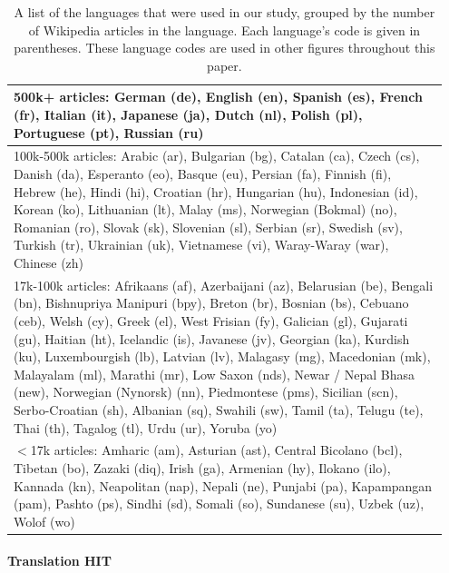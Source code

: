 \documentclass[11pt]{article}
\begin{document}
\begin{table}[h]
\scriptsize 
\begin{center}
\begin{tabular}{|p{0.95\linewidth}|}
\hline
{\sc 500k+ articles:} German (de), English (en), Spanish (es), French (fr), Italian (it), Japanese (ja), Dutch (nl), Polish (pl), Portuguese (pt), Russian (ru)\\
\hline
{\sc 100k-500k articles:} Arabic (ar), Bulgarian (bg), Catalan (ca), Czech (cs), Danish (da), Esperanto (eo), Basque (eu), Persian (fa), Finnish (fi), Hebrew (he), Hindi (hi), Croatian (hr), Hungarian (hu), Indonesian (id), Korean (ko), Lithuanian (lt), Malay (ms), Norwegian (Bokmal) (no), Romanian (ro), Slovak (sk), Slovenian (sl), Serbian (sr), Swedish (sv), Turkish (tr), Ukrainian (uk), Vietnamese (vi), Waray-Waray (war), Chinese (zh)\\
\hline
{\sc 17k-100k articles:}
Afrikaans (af), Azerbaijani (az), Belarusian (be), Bengali (bn), Bishnupriya Manipuri (bpy), Breton (br), Bosnian (bs), Cebuano (ceb), Welsh (cy), Greek (el), West Frisian (fy), Galician (gl), Gujarati (gu), Haitian (ht), Icelandic (is), Javanese (jv), Georgian (ka), Kurdish (ku), Luxembourgish (lb), Latvian (lv), Malagasy (mg), Macedonian (mk), Malayalam (ml), Marathi (mr), Low Saxon (nds), Newar / Nepal Bhasa (new), Norwegian (Nynorsk) (nn), Piedmontese (pms), Sicilian (scn), Serbo-Croatian (sh), Albanian (sq), Swahili (sw), Tamil (ta), Telugu (te), Thai (th), Tagalog (tl), Urdu (ur), Yoruba (yo)\\
\hline
{\sc $<$17k articles:} Amharic (am), Asturian (ast), Central Bicolano (bcl), Tibetan (bo), Zazaki (diq), Irish (ga), Armenian (hy), Ilokano (ilo), Kannada (kn), Neapolitan (nap), Nepali (ne), Punjabi (pa), Kapampangan (pam), Pashto (ps), Sindhi (sd), Somali (so), Sundanese (su), Uzbek (uz), Wolof (wo)\\
\hline
\end{tabular}
\end{center}
\normalsize
\caption{A list of the languages that were used in our study, grouped by the number of Wikipedia articles in the language.  Each language's code is given in parentheses.  These language codes are used in other figures throughout this paper.}\label{wikipedia-buckets}
\end{table}%

\paragraph{Translation HIT}
\end{document}
